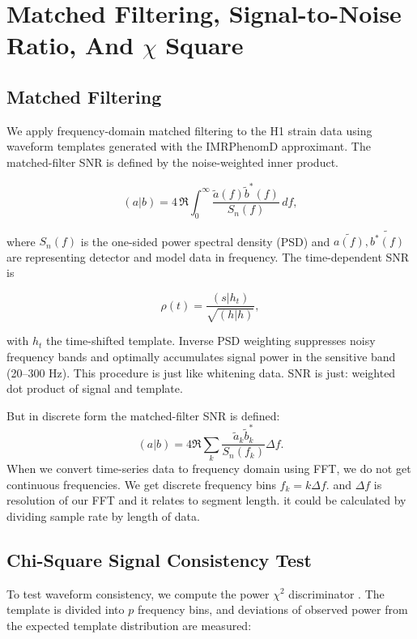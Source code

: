 \section{Matched Filtering, Signal-to-Noise Ratio, And $\chi$ Square} \label{sec:6}

\subsection{Matched Filtering}

We apply frequency-domain matched filtering to the H1 strain data
using waveform templates generated with the IMRPhenomD approximant.
The matched-filter SNR is defined by the noise-weighted inner product.

\begin{equation}
	(a|b) = 4 \, \Re \int_{0}^{\infty}
	\frac{\tilde{a}(f)\tilde{b}^*(f)}{S_n(f)} \, df ,
\end{equation}

where $S_n(f)$ is the one-sided power spectral density (PSD) and $\tilde{a(f)}, \tilde{b^*(f)}$ are representing detector and model data in frequency. 
The time-dependent SNR is

\begin{equation}
	\rho(t) = \frac{(s|h_t)}{\sqrt{(h|h)}} ,
\end{equation}

with $h_t$ the time-shifted template.
Inverse PSD weighting suppresses noisy frequency bands and
optimally accumulates signal power in the sensitive band
(20--300 Hz). This procedure is just like whitening data.
SNR is just: weighted dot product of signal and template.

But in discrete form the matched-filter SNR is defined:
\begin{equation}
	(a|b) = 4 \Re \sum_{k} \frac{\tilde{a}_k \tilde{b}_k^*}{S_n(f_k)} \Delta f .
\end{equation}
When we convert time-series data to frequency domain using FFT, we do not get continuous frequencies.
We get discrete frequency bins $f_k = k \Delta f$. and $\Delta f$ is resolution of our FFT and it relates to segment length. it could be calculated by dividing sample rate by length of data. 
 
\subsection{Chi-Square Signal Consistency Test}
To test waveform consistency, we compute the
power $\chi^2$ discriminator \cite{Allen2005Chisq}.
The template is divided into $p$ frequency bins,
and deviations of observed power from the expected template
distribution are measured:

